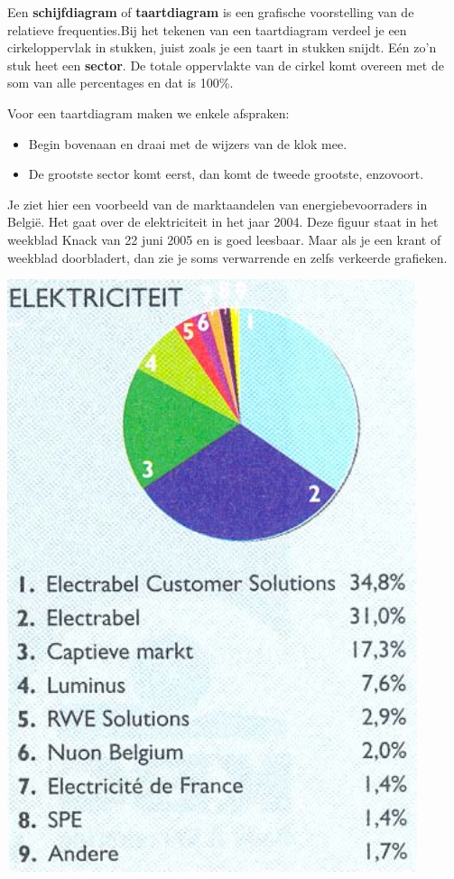 \documentclass[12pt,twoside]{article}
\begin{document}
\begin{minipage}{0.5\linewidth}
Een {\bf schijfdiagram} of {\bf taartdiagram} is een grafische voorstelling van de relatieve frequenties.Bij het tekenen van een taartdiagram verdeel je een cirkeloppervlak in stukken, juist zoals je een taart in stukken snijdt. Eén zo'n stuk heet een {\bf sector}. De totale oppervlakte van de cirkel komt overeen met de som van alle percentages en dat is 100\%.

Voor een taartdiagram maken we enkele afspraken:
\begin{itemize}
  \item Begin bovenaan en draai met de wijzers van de klok mee.
  \item De grootste sector komt eerst, dan komt de tweede
grootste, enzovoort.
\end{itemize}

Je ziet hier een voorbeeld van de marktaandelen van energiebevoorraders in België. Het gaat over de elektriciteit in het jaar 2004. Deze figuur staat in het weekblad Knack van 22 juni 2005 en is goed leesbaar. Maar als je een krant of weekblad doorbladert, dan zie je soms verwarrende en zelfs verkeerde grafieken.
\end{minipage}
\begin{minipage}{0.5\linewidth}
\begin{center}
  \includegraphics[width=0.9\textwidth]{cirkeldiagram_electriciteit}
\end{center}
\end{minipage}
\end{document}
